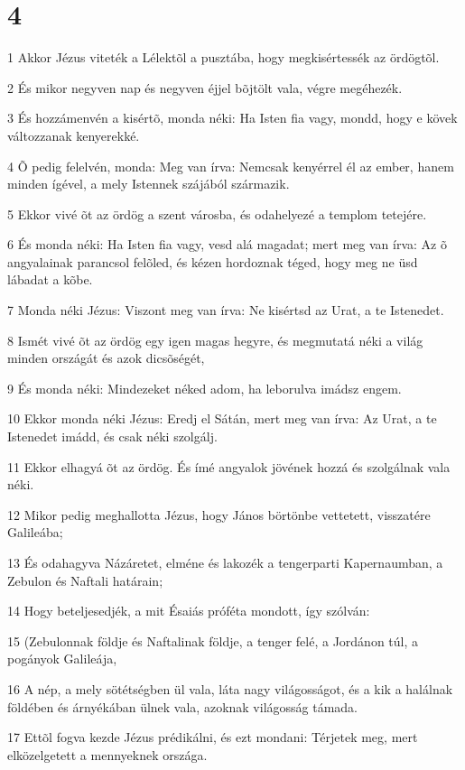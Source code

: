 \chapter{4}

\par 1 Akkor Jézus viteték a Lélektõl a pusztába, hogy megkisértessék az ördögtõl.
\par 2 És mikor negyven nap és negyven éjjel bõjtölt vala, végre megéhezék.
\par 3 És hozzámenvén a kisértõ, monda néki: Ha Isten fia vagy, mondd, hogy e kövek változzanak kenyerekké.
\par 4 Õ pedig felelvén, monda: Meg van írva: Nemcsak kenyérrel él az ember, hanem minden ígével, a mely Istennek szájából származik.
\par 5 Ekkor vivé õt az ördög a szent városba, és odahelyezé a templom tetejére.
\par 6 És monda néki: Ha Isten fia vagy, vesd alá magadat; mert meg van írva: Az õ angyalainak parancsol felõled, és kézen hordoznak téged, hogy meg ne üsd lábadat a kõbe.
\par 7 Monda néki Jézus: Viszont meg van írva: Ne kisértsd az Urat, a te Istenedet.
\par 8 Ismét vivé õt az ördög egy igen magas hegyre, és megmutatá néki a világ minden országát és azok dicsõségét,
\par 9 És monda néki: Mindezeket néked adom, ha leborulva imádsz engem.
\par 10 Ekkor monda néki Jézus: Eredj el Sátán, mert meg van írva: Az Urat, a te Istenedet imádd, és csak néki szolgálj.
\par 11 Ekkor elhagyá õt az ördög. És ímé angyalok jövének hozzá és szolgálnak vala néki.
\par 12 Mikor pedig meghallotta Jézus, hogy János börtönbe vettetett, visszatére Galileába;
\par 13 És odahagyva Názáretet, elméne és lakozék a tengerparti Kapernaumban, a Zebulon és Naftali határain;
\par 14 Hogy beteljesedjék, a mit Ésaiás próféta mondott, így szólván:
\par 15 (Zebulonnak földje és Naftalinak földje, a tenger felé, a Jordánon túl, a pogányok Galileája,
\par 16 A nép, a mely sötétségben ül vala, láta nagy világosságot, és a kik a halálnak földében és árnyékában ülnek vala, azoknak világosság támada.
\par 17 Ettõl fogva kezde Jézus prédikálni, és ezt mondani: Térjetek meg, mert elközelgetett a mennyeknek országa.
